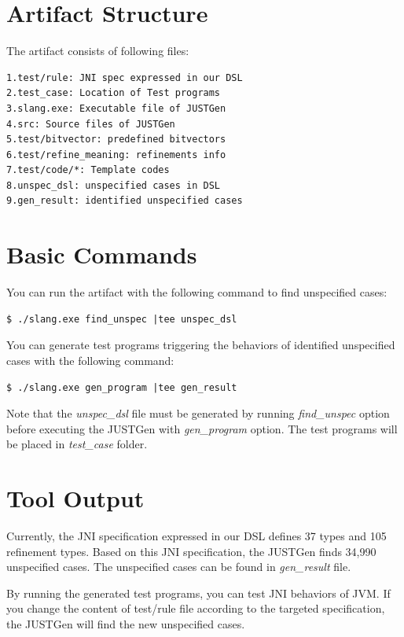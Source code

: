 \documentclass[conference]{IEEEtran}
\begin{document}
\section{Artifact Structure}

The artifact consists of following files:

\begin{lstlisting}
1.test/rule: JNI spec expressed in our DSL 
2.test_case: Location of Test programs
3.slang.exe: Executable file of JUSTGen
4.src: Source files of JUSTGen
5.test/bitvector: predefined bitvectors
6.test/refine_meaning: refinements info 
7.test/code/*: Template codes
8.unspec_dsl: unspecified cases in DSL 
9.gen_result: identified unspecified cases
\end{lstlisting}

\section{Basic Commands}

You can run the artifact with the following command to find unspecified cases:
\begin{lstlisting}
$ ./slang.exe find_unspec |tee unspec_dsl
\end{lstlisting}

You can generate test programs triggering the behaviors of identified unspecified cases with the following command:
\begin{lstlisting}
$ ./slang.exe gen_program |tee gen_result
\end{lstlisting}

Note that the \textit{unspec\_dsl} file must be generated by running \textit{find\_unspec} option before executing the JUSTGen with \textit{gen\_program} option.
The test programs will be placed in \textit{test\_case} folder.

\section{Tool Output}
Currently, the JNI specification expressed in our DSL defines 37 types and 105 refinement types. 
Based on this JNI specification, the JUSTGen finds 34,990 unspecified cases.
The unspecified cases can be found in \textit{gen\_result} file.

By running the generated test programs, you can test JNI behaviors of JVM. 
If you change the content of test/rule file according to the targeted specification, 
the JUSTGen will find the new unspecified cases.
\end{document}
